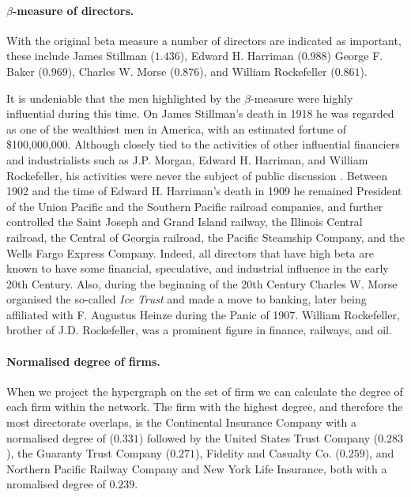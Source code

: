 \paragraph{$\beta$-measure of directors.}

With the original beta measure a number of directors are indicated as important, these include James Stillman ($1.436$), Edward H. Harriman ($0.988$) George F. Baker ($0.969$), Charles W. Morse ($0.876$), and William Rockefeller ($0.861$).

It is undeniable that the men highlighted by the $\beta$-measure were highly influential during this time. On James Stillman's death in 1918 he was regarded as one of the wealthiest men in America, with an estimated fortune of \$100,000,000. Although closely tied to the activities of other influential financiers and industrialists such as J.P. Morgan, Edward H. Harriman, and William Rockefeller, his activities were never the subject of public discussion \citep{NYT1918Stillman}. Between 1902 and the time of Edward H. Harriman's death in 1909 he remained President of the Union Pacific and the Southern Pacific railroad companies, and further controlled the Saint Joseph and Grand Island railway, the Illinois Central railroad, the Central of Georgia railroad, the Pacific Steamship Company, and the Wells Fargo Express Company. Indeed, all directors that have high beta are known to have some financial, speculative, and industrial influence in the early 20th Century. Also, during the beginning of the 20th Century Charles W. Morse organised the so-called \emph{Ice Trust} and made a move to banking, later being affiliated with F. Augustus Heinze during the Panic of 1907. William Rockefeller, brother of J.D. Rockefeller, was a prominent figure in finance, railways, and oil.

\paragraph{Normalised degree of firms.}

When we project the hypergraph on the set of firm we can calculate the degree of each firm within the network. The firm with the highest degree, and therefore the most directorate overlaps, is the Continental Insurance Company with a normalised degree of ($0.331$) followed by the United States Trust Company ($0.283$), the Guaranty Trust Company ($0.271$), Fidelity and Casualty Co. ($0.259$), and Northern Pacific Railway Company and New York Life Insurance, both with a nromalised degree of $0.239$.


